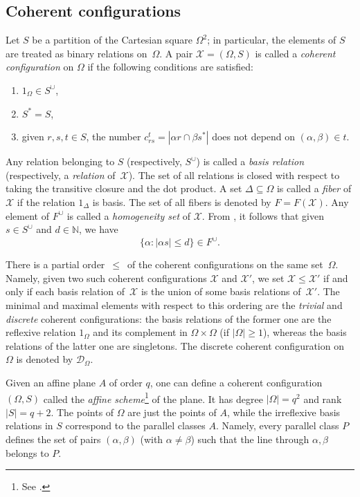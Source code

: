 \documentclass{amsart}
\newcommand{\cal}{\mathcal}
\def\nmrt{\begin{enumerate}}
\def\enmrt{\end{enumerate}}
\def\tm#1{\item[{\rm (#1)}]}
\def\qtnl#1{\begin{equation}\label{#1}}
\def\eqtn{\end{equation}}
\def\cD{{\cal D}}
\def\cX{{\cal X}}
\def\mN{{\mathbb N}}
\begin{document}
\subsection{Coherent configurations}
Let $S$ be a partition of the Cartesian square $\Omega^2$; in particular, the elements of $S$ are treated as binary relations on~$\Omega$. A pair $\cX=(\Omega,S)$ is called a {\it coherent configuration} on $\Omega$ if the following conditions are satisfied:
\nmrt
\tm{C1}  $1_{\Omega}\in S^\cup$,
\tm{C2} $S^*=S$,
\tm{C3} given $r,s,t\in S$, the number $c_{rs}^t=|\alpha r\cap \beta s^{*}|$ does not depend on $(\alpha,\beta)\in t$. 
\enmrt

Any relation belonging to $S$ (respectively, $S^\cup$)  is called a {\it basis relation} (respectively, a {\it relation} of~$\cX$). The set of all relations is closed with respect to taking the transitive closure and the dot product. A set $\Delta \subseteq \Omega$ is called a {\it fiber} of $\cX$ if the relation $1_{\Delta}$ is basis. The set of all fibers is denoted by $F=F(\cX)$. Any element of $F^\cup$ is called a {\it homogeneity set} of $\cX$. From \cite[Theorem~2.6.7]{CP2019}, it follows that given $s\in S^\cup$ and $d\in \mN$, we have
\qtnl{180723d}
\{\alpha\colon|\alpha s|\leq d\}\in F^\cup.
\eqtn 

There is a partial order\, $\le$\, of the coherent configurations on the same set~$\Omega$. Namely, given two such coherent configurations $\cX$ and $\cX'$, we set $\cX\le\cX'$ if and only if each basis relation of~$\cX$ is the union of some basis relations of~$\cX'$. The minimal and maximal elements with respect to this ordering are the {\it trivial} and {\it discrete} coherent configurations: the basis 
relations of the former one are the reflexive relation $1_\Omega$ and its complement 
in $\Omega\times\Omega$ (if $|\Omega|\geq 1$), whereas the basis relations of 
the latter one are singletons. The discrete coherent configuration on $\Omega$ is denoted by $\cD_\Omega$.

Given an affine plane $A$ of order $q$, one can define a coherent 
configuration $(\Omega,S)$ called the \emph{affine scheme}\footnote{See  \cite[Subsection~2.5.2]{CP2019}.} 
of the plane. It has degree $|\Omega|=q^2$ and rank $|S|=q+2$. 
The points of $\Omega$ are just the points of $A$, while 
the irreflexive basis relations in $S$ correspond to the parallel 
classes $A$. Namely, every parallel class $P$ defines the set of 
pairs $(\alpha,\beta)$ (with $\alpha\ne \beta$) such that 
the line through $\alpha,\beta$ belongs to $P$.
\end{document}
